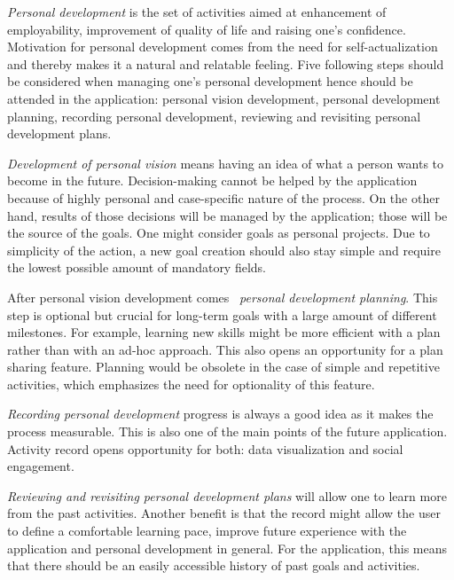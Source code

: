 \textit{Personal development} is the set of activities aimed at enhancement of employability, improvement of quality of life and raising one's confidence.\cite{what-is-personal-development}
Motivation for personal development comes from the need for self-actualization and thereby makes it a natural and relatable feeling.
Five following steps should be considered when managing one's personal development hence should be attended in the application:
personal vision development, personal development planning, recording personal development, reviewing and revisiting personal development plans.

\textit{Development of personal vision} means having an idea of what a person wants to become in the future.
Decision-making cannot be helped by the application because of highly personal and case-specific nature of the process.
On the other hand, results of those decisions will be managed by the application;
those will be the source of the goals.
One might consider goals as personal projects.
Due to simplicity of the action, a new goal creation should also stay simple and require the lowest possible amount of mandatory fields.

After personal vision development comes ~\textit{personal development planning}.
This step is optional but crucial for long-term goals with a large amount of different milestones.
For example, learning new skills might be more efficient with a plan rather than with an ad-hoc approach.
This also opens an opportunity for a plan sharing feature.
Planning would be obsolete in the case of simple and repetitive activities, which emphasizes the need for optionality of this feature.
%

\textit{Recording personal development} progress is always a good idea as it makes the process measurable.
This is also one of the main points of the future application.
Activity record opens opportunity for both: data visualization and social engagement.

\textit{Reviewing and revisiting personal development plans} will allow one to learn more from the past activities.
Another benefit is that the record might allow the user to define a comfortable learning pace, improve future
experience with the application and personal development in general.
For the application, this means that there should be an easily accessible history of past goals and activities.

